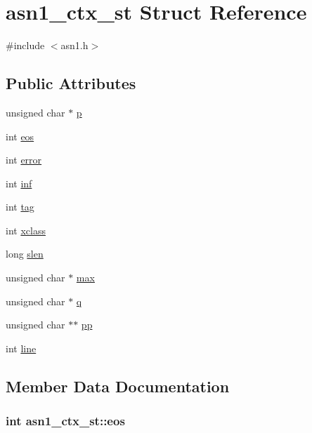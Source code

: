 \hypertarget{structasn1__ctx__st}{}\section{asn1\+\_\+ctx\+\_\+st Struct Reference}
\label{structasn1__ctx__st}


{\ttfamily \#include $<$asn1.\+h$>$}

\subsection*{Public Attributes}
\begin{DoxyCompactItemize}
\item 
unsigned char $\ast$ \hyperlink{structasn1__ctx__st_a4055e8e978696b3ebe48663e27aaccfd}{p}
\item 
int \hyperlink{structasn1__ctx__st_acfa7be33fd2e45713f6ae576c929c8fc}{eos}
\item 
int \hyperlink{structasn1__ctx__st_ad615bc5c2f51b7b53714efab6848410e}{error}
\item 
int \hyperlink{structasn1__ctx__st_a3c7aed3d59e1266f44363d75532b3c37}{inf}
\item 
int \hyperlink{structasn1__ctx__st_a50c207efa22cdc9e926f70c3e05ebd8b}{tag}
\item 
int \hyperlink{structasn1__ctx__st_a13d5a9bd152573c46b088acac3f7671f}{xclass}
\item 
long \hyperlink{structasn1__ctx__st_ae23813e92662ef3caff611c92fe51879}{slen}
\item 
unsigned char $\ast$ \hyperlink{structasn1__ctx__st_a22989e6f8850b237b7982c8f1c3f27a1}{max}
\item 
unsigned char $\ast$ \hyperlink{structasn1__ctx__st_a2b0e6ae963399039db4a27f09ade7e41}{q}
\item 
unsigned char $\ast$$\ast$ \hyperlink{structasn1__ctx__st_a1f8419ae235a22405868d87136f3b098}{pp}
\item 
int \hyperlink{structasn1__ctx__st_adc9183c7070fe39aeff12711311c76b4}{line}
\end{DoxyCompactItemize}


\subsection{Member Data Documentation}
\subsubsection[{\texorpdfstring{eos}{eos}}]{\setlength{\rightskip}{0pt plus 5cm}int asn1\+\_\+ctx\+\_\+st\+::eos}\hypertarget{structasn1__ctx__st_acfa7be33fd2e45713f6ae576c929c8fc}{}\label{structasn1__ctx__st_acfa7be33fd2e45713f6ae576c929c8fc}
